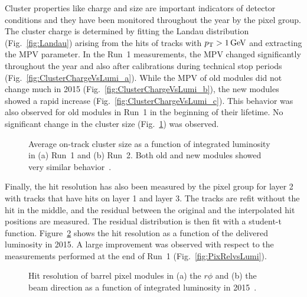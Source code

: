 Cluster properties like charge and size are important indicators of detector conditions and they have been monitored throughout the year by the pixel group.
The cluster charge is determined by fitting the Landau distribution (Fig.~\ref{fig:Landau}) arising from the hits of tracks with $p_{\mathrm{T}} > 1\,\text{Ge\hspace{-.08em}V}$ and extracting the MPV parameter.
In the Run~1 measurements, the MPV changed significantly throughout the year and also after calibrations during technical stop periods (Fig.~\ref{fig:ClusterChargeVsLumi_a}).
While the MPV of old modules did not change much in 2015 (Fig.~\ref{fig:ClusterChargeVsLumi_b}), the new modules showed a rapid increase (Fig.~\ref{fig:ClusterChargeVsLumi_c}).
This behavior was also observed for old modules in Run~1 in the beginning of their lifetime. No significant change in the cluster size (Fig.~\ref{fig:ClusterSizeVsLumi}) was observed.

\begin{figure}[!htb]
 \begin{center}
 \end{center}
 \caption{Average on-track cluster size as a function of integrated luminosity in (a) Run~1 and (b) Run~2. Both old and new modules showed very similar behavior~\cite{PixelOffline}.}
 \label{fig:ClusterSizeVsLumi}
\end{figure}

Finally, the hit resolution has also been measured by the pixel group for layer 2 with tracks that have hits on layer 1 and layer 3.
The tracks are refit without the hit in the middle, and the residual between the original and the interpolated hit positions are measured.
The residual distribution is then fit with a student-t function. Figure~\ref{fig:RelVsLumi2015} shows the hit resolution as a function of the delivered luminosity in 2015.
A large improvement was observed with respect to the measurements performed at the end of Run~1 (Fig.~\ref{fig:PixRelvsLumi}).

\begin{figure}[!htb]
 \begin{center}
 \end{center}
 \caption{Hit resolution of barrel pixel modules in (a) the $r\phi$ and (b) the beam direction as a function of integrated luminosity in 2015~\cite{PixelOffline}.}
 \label{fig:RelVsLumi2015}
\end{figure}
